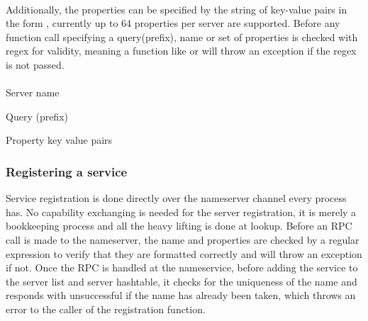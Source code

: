 \paragraph{}
Additionally, the properties can be specified by the string of key-value pairs in the form , currently up to 64 properties per server are supported.
Before any function call specifying a query(prefix), name or set of properties is checked with regex for validity, meaning a function like  or  will throw an exception if the regex is not passed.
\paragraph{}
\newline
\begin{code}
\begin{mdframed}[style=myframe]
\ttfamily{\textasciicircum\/([a-z]|[A-Z])+([a-z]|[A-Z]|[0-9])*(/([a-z]|[A-Z])+([a-z]|[A-Z]|[0-9])*)*\$}
\end{mdframed}
\caption{Server name}
\newline
\label{code:regex_checks}
\end{code}
\begin{code}

\begin{mdframed}[style=myframe]
\end{mdframed}
\caption{Query (prefix)}
\newline
\label{code:regex_checks}
\end{code}
\begin{code}
\begin{mdframed}[style=myframe]
\ttfamily{\textasciicircum(([a-z]|[A-Z])*=([a-z]|[A-Z]|[0-9]|:|-)*)(,([a-z]|[A-Z])*=([a-z]|[A-Z]|[0-9]|:|-)*)*\$}
\end{mdframed}
\caption{Property key value pairs}
\newline
\label{code:regex_checks}
\end{code}



\subsubsection{Registering a service}

Service registration is done directly over the nameserver channel every process has. No capability exchanging is needed for the server registration, it is merely a bookkeeping process and all the heavy lifting is done at lookup. Before an RPC call is made to the nameserver, the name and properties are checked by a regular expression to verify that they are formatted correctly and will throw an exception if not. Once the RPC is handled at the nameservice, before adding the service to the server list and server hashtable, it checks for the uniqueness of the name and responds with unsuccessful if the name has already been taken, which throws an error to the caller of the registration function.
